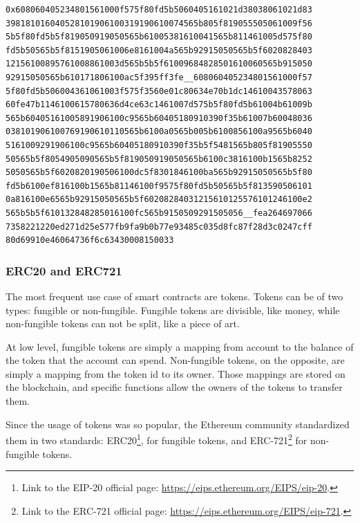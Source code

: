 \begin{lstlisting}[caption={EVM bytecode derived from compiling the contract shown in \cref{lst:solidity-example}. There are three parts divided by \_\_: the first part is the deployment code, the second part is the runtime code and the last part is the CBOR-endoded metadata.},label={lst:solc-result},captionpos=b, style=boxed,breaklines]
0x608060405234801561000f575f80fd5b5060405161021d38038061021d83
398181016040528101906100319190610074565b805f819055505061009f56
5b5f80fd5b5f819050919050565b61005381610041565b811461005d575f80
fd5b50565b5f8151905061006e8161004a565b92915050565b5f6020828403
12156100895761008861003d565b5b5f61009684828501610060565b915050
92915050565b610171806100ac5f395ff3fe__608060405234801561000f57
5f80fd5b506004361061003f575f3560e01c80634e70b1dc14610043578063
60fe47b1146100615780636d4ce63c1461007d575b5f80fd5b61004b61009b
565b60405161005891906100c9565b60405180910390f35b61007b60048036
038101906100769190610110565b6100a0565b005b6100856100a9565b6040
5161009291906100c9565b60405180910390f35b5f5481565b805f81905550
50565b5f8054905090565b5f819050919050565b6100c3816100b1565b8252
5050565b5f6020820190506100dc5f8301846100ba565b92915050565b5f80
fd5b6100ef816100b1565b81146100f9575f80fd5b50565b5f813590506101
0a816100e6565b92915050565b5f60208284031215610125576101246100e2
565b5b5f610132848285016100fc565b9150509291505056__fea264697066
7358221220ed271d25e577fb9fa9b0b77e93485c035d8fc87f28d3c0247cff
80d69910e46064736f6c63430008150033
\end{lstlisting}

\subsubsection{ERC20 and ERC721}

The most frequent use case of smart contracts are tokens. Tokens can be of two types: fungible or non-fungible. Fungible tokens are divisible, like money, while non-fungible tokens can not be split, like a piece of art. 

At low level, fungible tokens are simply a mapping from account to the balance of the token that the account can spend. Non-fungible tokens, on the opposite, are simply a mapping from the token id to its owner. Those mappings are stored on the blockchain, and specific functions allow the owners of the tokens to transfer them.

Since the usage of tokens was so popular, the Ethereum community standardized them in two standards: ERC20\footnote{Link to the EIP-20 official page: \url{https://eips.ethereum.org/EIPS/eip-20}.}, for fungible tokens, and ERC-721\footnote{Link to the ERC-721 official page: \url{https://eips.ethereum.org/EIPS/eip-721}.} for non-fungible tokens. 

